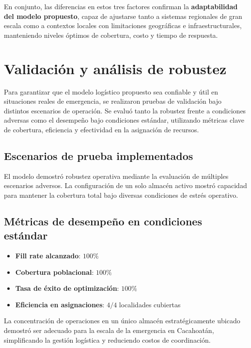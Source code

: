 \documentclass[
  spanish,
  us-letterpaper,
]{scrreprt}
\providecommand{\tightlist}{%
  \setlength{\itemsep}{0pt}\setlength{\parskip}{0pt}}
\numberwithin{equation}{section}
\begin{document}
En conjunto, las diferencias en estos tres factores confirman la
\textbf{adaptabilidad del modelo propuesto}, capaz de ajustarse tanto a
sistemas regionales de gran escala como a contextos locales con
limitaciones geográficas e infraestructurales, manteniendo niveles
óptimos de cobertura, costo y tiempo de respuesta.

\section{Validación y análisis de
robustez}\label{validaciuxf3n-y-anuxe1lisis-de-robustez}

Para garantizar que el modelo logístico propuesto sea confiable y útil
en situaciones reales de emergencia, se realizaron pruebas de validación
bajo distintos escenarios de operación. Se evaluó tanto la robustez
frente a condiciones adversas como el desempeño bajo condiciones
estándar, utilizando métricas clave de cobertura, eficiencia y
efectividad en la asignación de recursos.

\subsection{Escenarios de prueba
implementados}\label{escenarios-de-prueba-implementados}

El modelo demostró robustez operativa mediante la evaluación de
múltiples escenarios adversos. La configuración de un solo almacén
activo mostró capacidad para mantener la cobertura total bajo diversas
condiciones de estrés operativo.

\subsection{Métricas de desempeño en condiciones
estándar}\label{sec-metricas}

\begin{itemize}
\tightlist
\item
  \textbf{Fill rate alcanzado}: \(100\%\)
\item
  \textbf{Cobertura poblacional}: \(100\%\)
\item
  \textbf{Tasa de éxito de optimización}: \(100\%\)
\item
  \textbf{Eficiencia en asignaciones}: \(4/4\) localidades cubiertas
\end{itemize}

La concentración de operaciones en un único almacén estratégicamente
ubicado demostró ser adecuado para la escala de la emergencia en
Cacahoatán, simplificando la gestión logística y reduciendo costos de
coordinación.
\end{document}
